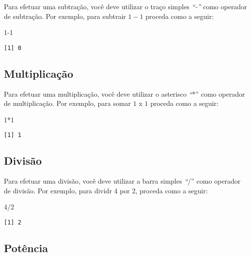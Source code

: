 \documentclass[
  letterpaper,
  DIV=11,
  numbers=noendperiod]{scrreprt}
\newenvironment{Shaded}{\begin{snugshade}}{\end{snugshade}}
\newcommand{\DecValTok}[1]{\textcolor[rgb]{0.68,0.00,0.00}{#1}}
\newcommand{\SpecialCharTok}[1]{\textcolor[rgb]{0.37,0.37,0.37}{#1}}
\begin{document}
Para efetuar uma subtração, você deve utilizar o traço simples
\emph{``-''} como operador de subtração. Por exemplo, para subtrair
\(1 - 1\) proceda como a seguir:

\begin{Shaded}
\begin{Highlighting}[]
\DecValTok{1{-}1}
\end{Highlighting}
\end{Shaded}

\begin{verbatim}
[1] 0
\end{verbatim}

\subsection{Multiplicação}\label{multiplicauxe7uxe3o}

Para efetuar uma multiplicação, você deve utilizar o asterisco
\emph{``}*'' como operador de multiplicação. Por exemplo, para somar
\(1\) x \(1\) proceda como a seguir:

\begin{Shaded}
\begin{Highlighting}[]
\DecValTok{1}\SpecialCharTok{*}\DecValTok{1}
\end{Highlighting}
\end{Shaded}

\begin{verbatim}
[1] 1
\end{verbatim}

\subsection{Divisão}\label{divisuxe3o}

Para efetuar uma divisão, você deve utilizar a barra simples
\emph{``}/'' como operador de divisão. Por exemplo, para dividr 4 por 2,
proceda como a seguir:

\begin{Shaded}
\begin{Highlighting}[]
\DecValTok{4}\SpecialCharTok{/}\DecValTok{2}
\end{Highlighting}
\end{Shaded}

\begin{verbatim}
[1] 2
\end{verbatim}

\subsection{Potência}\label{potuxeancia}
\end{document}
